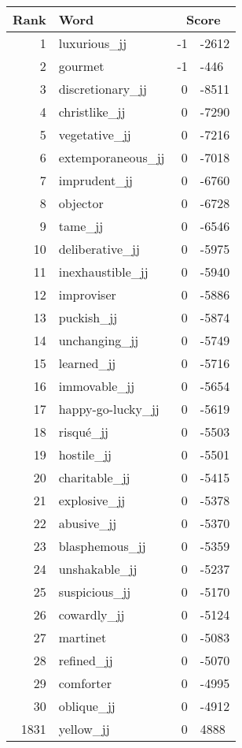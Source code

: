 \begin{longtable}[!htbp]{| rlr@{.}l |}
    \hline
    \textbf{Rank} & \textbf{Word} & \multicolumn{2}{c|}{\textbf{Score}} \\
    \hline
    \endhead
    1 & luxurious\_jj & -1 & -2612 \\
    2 & gourmet & -1 & -446 \\
    3 & discretionary\_jj & 0 & -8511 \\
    4 & christlike\_jj & 0 & -7290 \\
    5 & vegetative\_jj & 0 & -7216 \\
    6 & extemporaneous\_jj & 0 & -7018 \\
    7 & imprudent\_jj & 0 & -6760 \\
    8 & objector & 0 & -6728 \\
    9 & tame\_jj & 0 & -6546 \\
    10 & deliberative\_jj & 0 & -5975 \\
    11 & inexhaustible\_jj & 0 & -5940 \\
    12 & improviser & 0 & -5886 \\
    13 & puckish\_jj & 0 & -5874 \\
    14 & unchanging\_jj & 0 & -5749 \\
    15 & learned\_jj & 0 & -5716 \\
    16 & immovable\_jj & 0 & -5654 \\
    17 & happy-go-lucky\_jj & 0 & -5619 \\
    18 & risqué\_jj & 0 & -5503 \\
    19 & hostile\_jj & 0 & -5501 \\
    20 & charitable\_jj & 0 & -5415 \\
    21 & explosive\_jj & 0 & -5378 \\
    22 & abusive\_jj & 0 & -5370 \\
    23 & blasphemous\_jj & 0 & -5359 \\
    24 & unshakable\_jj & 0 & -5237 \\
    25 & suspicious\_jj & 0 & -5170 \\
    26 & cowardly\_jj & 0 & -5124 \\
    27 & martinet & 0 & -5083 \\
    28 & refined\_jj & 0 & -5070 \\
    29 & comforter & 0 & -4995 \\
    30 & oblique\_jj & 0 & -4912 \\
    1831 & yellow\_jj & 0 & 4888 \\

\end{longtable}
